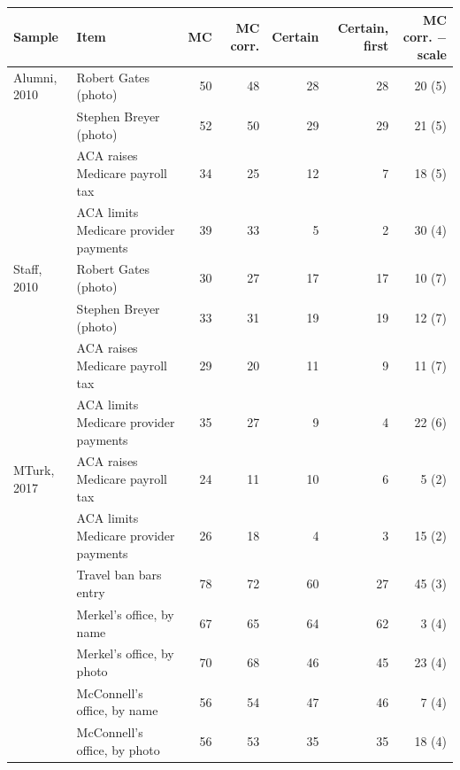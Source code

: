 \begin{tabular}{llrrrrr}
\toprule
Sample & Item & MC & MC corr. & Certain & Certain, first & MC corr. $-$ scale \\
\midrule
Alumni, 2010 & Robert Gates (photo) & 50 & 48 & 28 & 28 & 20 (5) \\
 & Stephen Breyer (photo) & 52 & 50 & 29 & 29 & 21 (5) \\
 & ACA raises Medicare payroll tax & 34 & 25 & 12 & 7 & 18 (5) \\
 & ACA limits Medicare provider payments & 39 & 33 & 5 & 2 & 30 (4) \\
Staff, 2010 & Robert Gates (photo) & 30 & 27 & 17 & 17 & 10 (7) \\
 & Stephen Breyer (photo) & 33 & 31 & 19 & 19 & 12 (7) \\
 & ACA raises Medicare payroll tax & 29 & 20 & 11 & 9 & 11 (7) \\
 & ACA limits Medicare provider payments & 35 & 27 & 9 & 4 & 22 (6) \\
MTurk, 2017 & ACA raises Medicare payroll tax & 24 & 11 & 10 & 6 & 5 (2) \\
 & ACA limits Medicare provider payments & 26 & 18 & 4 & 3 & 15 (2) \\
 & Travel ban bars entry & 78 & 72 & 60 & 27 & 45 (3) \\
 & Merkel's office, by name & 67 & 65 & 64 & 62 & 3 (4) \\
 & Merkel's office, by photo & 70 & 68 & 46 & 45 & 23 (4) \\
 & McConnell's office, by name & 56 & 54 & 47 & 46 & 7 (4) \\
 & McConnell's office, by photo & 56 & 53 & 35 & 35 & 18 (4) \\
\bottomrule
\end{tabular}
